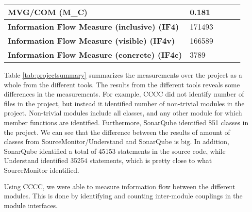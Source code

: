 \begin{table}[]
\begin{tabular}{|l|l|l|l|l|}
\textbf{MVG/COM (M\_C)}                             & 0.181         &                    &                                          &                        \\ \hline
\textbf{Information Flow Measure (inclusive) (IF4)} & 171493        &                    &                                          &                        \\ \hline
\textbf{Information Flow Measure (visible) (IF4v)}  & 166589        &                    &                                          &                        \\ \hline
\textbf{Information Flow Measure (concrete) (IF4c)} & 3789          &                    &                                          &                        \\ \hline
\end{tabular}
\end{table}


Table \ref{tab:projectsummary} summarizes the measurements over the project as a whole from the different tools. The results from the different tools reveals some differences in the measurements. For example, CCCC did not identify number of files in the project, but instead it identified number of non-trivial modules in the project. Non-trivial modules include all classes, and any other module for which member functions are identified. Furthermore, SonarQube identified 851 classes in the project. We can see that the difference between the results of amount of classes from SourceMonitor/Understand and SonarQube is big. In addition, SonarQube identified a total of 45153 statements in the source code, while Understand identified 35254 statements, which is pretty close to what SourceMonitor identified. 

Using CCCC, we were able to measure information flow between the different modules. This is done by identifying and counting inter-module couplings in the module interfaces. 




